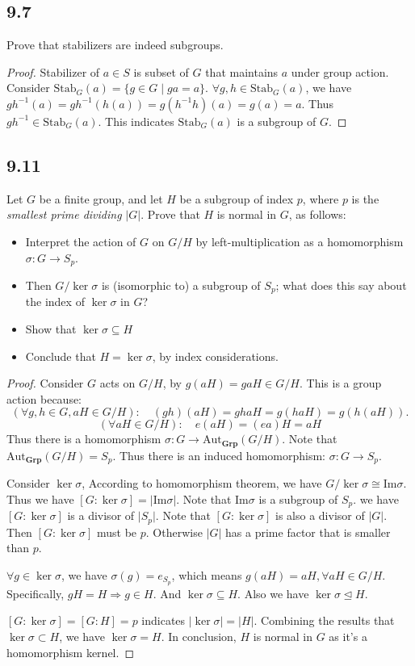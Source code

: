 \documentclass[a4paper, pdf, 12pt]{article}
\begin{document}
\subsection*{9.7}
Prove that stabilizers are indeed subgroups.
\begin{proof}
  Stabilizer of $a\in S$ is subset of $G$ that maintains $a$ under 
  group action. Consider $\mbox{Stab}_{G}(a) = \{g\in G\mid ga = a\}$. 
  $\forall g,h\in \mbox{Stab}_{G}(a)$, we have $gh^{-1}(a) = gh^{-1}(h(a)) = g(h^{-1}h)(a) = g(a) = a$. Thus
  $gh^{-1}\in \mbox{Stab}_{G}(a)$. This indicates $\mbox{Stab}_{G}(a)$ is a subgroup of $G$.
\end{proof}

\subsection*{9.11}
Let $G$ be a finite group, and let $H$ be a subgroup of index $p$, where $p$ is the 
\textit{smallest prime dividing} $\lvert G\rvert$. Prove that $H$ is normal in $G$, as 
follows:
\begin{itemize}
  \item Interpret the action of $G$ on $G/H$ by left-multiplication as a homomorphism $\sigma:G\rightarrow S_{p}$.
  \item Then $G/\ker \sigma$ is (isomorphic to) a subgroup of $S_{p}$; what does this say about the index of $\ker \sigma$ in $G$?
  \item Show that $\ker \sigma\subseteq H$
  \item Conclude that $H=\ker \sigma$, by index considerations.
\end{itemize}
\begin{proof}
  Consider $G$ acts on $G/H$, by $g(aH) = gaH\in G/H$. This is a group action because:
  $$
  (\forall g, h\in G,aH\in G/H):\quad (gh)(aH) = ghaH = g(haH) = g(h(aH)).
  $$
  $$
  (\forall aH\in G/H):\quad e(aH) = (ea)H = aH
  $$
  Thus there is a homomorphism $\sigma: G\rightarrow \mbox{Aut}_{\mathbf{Grp}}(G/H)$. Note that $\mbox{Aut}_{\mathbf{Grp}}(G/H) = S_{p}$. Thus 
  there is an induced homomorphism: $\sigma: G\rightarrow S_{p}$.

  Consider $\ker \sigma$, According to homomorphism theorem, we have $G/\ker \sigma \cong \mbox{Im}\sigma$. Thus we have 
  $[G:\ker \sigma] = \lvert \mbox{Im}\sigma \rvert$. Note that $\mbox{Im}\sigma$ is a subgroup of $S_{p}$. we have $[G:\ker \sigma]$ is a 
  divisor of $\lvert S_{p}\rvert$. Note that $[G:\ker\sigma]$ is also a divisor of $\lvert G\rvert$. Then $[G:\ker \sigma]$ must be $p$. 
  Otherwise $\lvert G\rvert$ has a prime factor that is smaller than $p$.

  $\forall g\in \ker \sigma$, we have $\sigma(g) = e_{S_{p}}$, which means $g(aH) = aH, \forall aH\in G/H$. Specifically, $gH = H\Rightarrow g\in H$. 
  And $\ker\sigma \subseteq H$. Also we have $\ker \sigma\trianglelefteq H$. 

  $[G:\ker\sigma] = [G:H] = p$ indicates $\lvert \ker \sigma \rvert = \lvert H\rvert$. Combining the results that $\ker\sigma \subset H$, we have $\ker\sigma = H$. In conclusion, 
  $H$ is normal in $G$ as it's a homomorphism kernel.
\end{proof}
\end{document}
